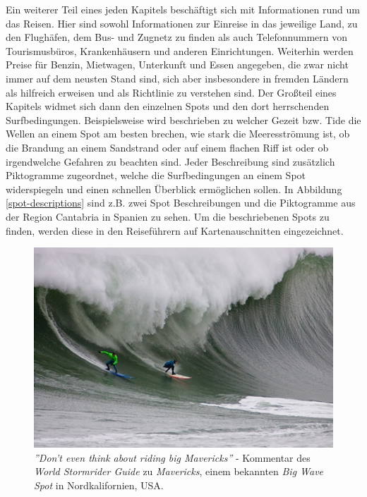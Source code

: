 Ein weiterer Teil eines jeden Kapitels beschäftigt sich mit
Informationen rund um das Reisen. Hier sind sowohl Informationen zur
Einreise in das jeweilige Land, zu den Flughäfen, dem Bus- und Zugnetz
zu finden als auch Telefonnummern von Tourismusbüros, Krankenhäusern
und anderen Einrichtungen. Weiterhin werden Preise für Benzin,
Mietwagen, Unterkunft und Essen angegeben, die zwar nicht immer auf
dem neusten Stand sind, sich aber insbesondere in fremden Ländern als
hilfreich erweisen und als Richtlinie zu verstehen sind. Der Großteil
eines Kapitels widmet sich dann den einzelnen Spots und den dort
herrschenden Surfbedingungen. Beispielsweise wird beschrieben zu
welcher Gezeit bzw. Tide die Wellen an einem Spot am besten brechen,
wie stark die Meeresströmung ist, ob die Brandung an einem Sandstrand
oder auf einem flachen Riff ist oder ob irgendwelche Gefahren zu
beachten sind. Jeder Beschreibung sind zusätzlich Piktogramme
zugeordnet, welche die Surfbedingungen an einem Spot widerspiegeln und
einen schnellen Überblick ermöglichen sollen. In Abbildung
\ref{spot-descriptions} sind z.B. zwei Spot Beschreibungen und die
Piktogramme aus der Region Cantabria in Spanien zu sehen. Um die
beschriebenen Spots zu finden, werden diese in den Reiseführern auf
Kartenauschnitten eingezeichnet.

\begin{figure}[h]
  \includegraphics[width=\textwidth]{bilder/mavericks}
  \caption{\textit{''Don't even think about riding big Mavericks''} -
    Kommentar des \textit{World Stormrider Guide} zu
    \textit{Mavericks}, einem bekannten \textit{Big Wave Spot} in
    Nordkalifornien, USA.}
\end{figure}

